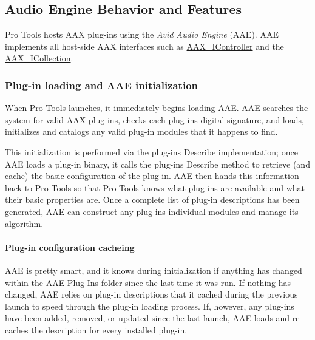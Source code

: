  \hypertarget{a00830_aax_pro_tools_guide_03_audio_engine_behavior}{}\subsection{Audio Engine Behavior and Features}\label{a00830_aax_pro_tools_guide_03_audio_engine_behavior}
 Pro Tools hosts A\+AX plug-\/ins using the {\itshape  Avid Audio Engine} (A\+AE). A\+AE implements all host-\/side A\+AX interfaces such as \mbox{\hyperlink{a01789}{A\+A\+X\+\_\+\+I\+Controller}} and the \mbox{\hyperlink{a01777}{A\+A\+X\+\_\+\+I\+Collection}}.

\hypertarget{a00830_subsection__plugin_loading_and_aae_initialization}{}\subsubsection{Plug-\/in loading and A\+A\+E initialization}\label{a00830_subsection__plugin_loading_and_aae_initialization}
 When Pro Tools launches, it immediately begins loading A\+AE. A\+AE searches the system for valid A\+AX plug-\/ins, checks each plug-\/in\textquotesingle{}s digital signature, and loads, initializes and catalogs any valid plug-\/in modules that it happens to find.

This initialization is performed via the plug-\/in\textquotesingle{}s Describe implementation; once A\+AE loads a plug-\/in binary, it calls the plug-\/in\textquotesingle{}s Describe method to retrieve (and cache) the basic configuration of the plug-\/in. A\+AE then hands this information back to Pro Tools so that Pro Tools knows what plug-\/ins are available and what their basic properties are. Once a complete list of plug-\/in descriptions has been generated, A\+AE can construct any plug-\/in\textquotesingle{}s individual modules and manage its algorithm.

\hypertarget{a00830_subsubsection__plugin_configuration_cacheing_}{}\paragraph{Plug-\/in configuration cacheing}\label{a00830_subsubsection__plugin_configuration_cacheing_}
 A\+AE is pretty smart, and it knows during initialization if anything has changed within the A\+AE Plug-\/\+Ins folder since the last time it was run. If nothing has changed, A\+AE relies on plug-\/in descriptions that it cached during the previous launch to speed through the plug-\/in loading process. If, however, any plug-\/ins have been added, removed, or updated since the last launch, A\+AE loads and re-\/caches the description for every installed plug-\/in.

